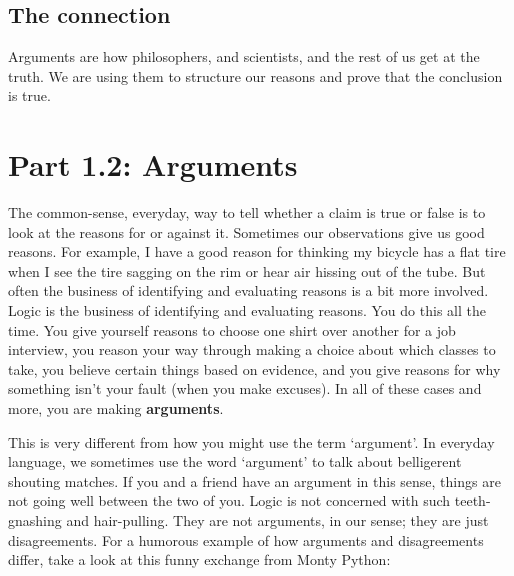 \subsection{The connection}

Arguments are how philosophers, and scientists, and the rest of us get at the truth. We are using them to structure our reasons and prove that the conclusion is true.

\section{Part 1.2: Arguments}
\label{s:p1.2}


The common-sense, everyday, way to tell whether a claim is true or false is to look at the reasons for or against it. Sometimes our observations give us good reasons. For example, I have a good reason for thinking my bicycle has a flat tire when I see the tire sagging on the rim or hear air hissing out of the tube. But often the business of identifying and evaluating reasons is a bit more involved. Logic is the business of identifying and evaluating reasons. You do this all the time. You give yourself reasons to choose one shirt over another for a job interview, you reason your way through making a choice about which classes to take, you believe certain things based on evidence, and you give reasons for why something isn't your fault (when you make excuses). In all of these cases and more, you are making \textbf{arguments}.

This is very different from how you might use the term ‘argument'. In everyday language, we sometimes use the word ‘argument’ to talk about belligerent shouting matches. If you and a friend have an argument in this sense, things are not going well between the two of you. Logic is not concerned with such teeth-gnashing and hair-pulling. They are not arguments, in our sense; they are just disagreements. For a humorous example of how arguments and disagreements differ, take a look at this funny exchange from Monty Python:\autocite{ArgumentClinic}

